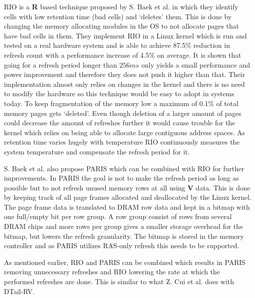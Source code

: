 RIO is a \textbf{R} based technique proposed by S. Baek et al. \cite{rioparis} in which they identify cells with low retention time (bad cells) and `deletes' them. This is done by changing the memory allocating modules in the OS to not allocate pages that have bad cells in them. They implement RIO in a Linux kernel which is run and tested on a real hardware system and is able to achieve 87.5\% reduction in refresh count with a performance increase of 4.5\% on average. It is shown that going for a refresh period longer than \(256ms\) only yields a small performance and power improvement and therefore they does not push it higher than that. Their implementation almost only relies on changes in the kernel and there is no need to modify the hardware so this technique would be easy to adopt in systems today. To keep fragmentation of the memory low a maximum of 0.1\% of total memory pages gets `deleted'. Even though deletion of a larger amount of pages could decrease the amount of refreshes further it would cause trouble for the kernel which relies on being able to allocate large contiguous address spaces. As retention time varies hugely with temperature RIO continuously measures the system temperature and compensate the refresh period for it. 

S. Baek et al. also propose PARIS which can be combined with RIO for further improvements. In PARIS the goal is not to make the refresh period as long as possible but to not refresh unused memory rows at all using \textbf{V} data. This is done by keeping track of all page frames allocated and deallocated by the Linux kernel. The page frame data is translated to DRAM row data and kept in a bitmap with one full/empty bit per row group. A row group consist of rows from several DRAM chips and more rows per group gives a smaller storage overhead for the bitmap, but lowers the refresh granularity. The bitmap is stored in the memory controller and as PARIS utilizes RAS-only refresh this needs to be supported. 

As mentioned earlier, RIO and PARIS can be combined which results in PARIS removing unnecessary refreshes and RIO lowering the rate at which the performed refreshes are done. This is similar to what Z. Cui et al. does with DTail-RV. 